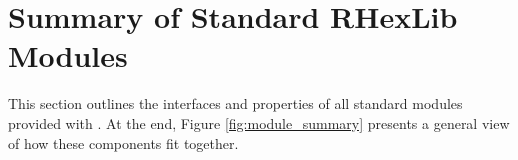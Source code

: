 %
%
% 
% 
% 
% 
% 

%
%

\chapter{Summary of Standard RHexLib Modules}
\label{sec:rhexlib_module_summary}

This section outlines the interfaces and properties of all standard modules
provided with \rhexlib. At the end, Figure \ref{fig:module_summary} presents 
a general view of how these components fit together.

